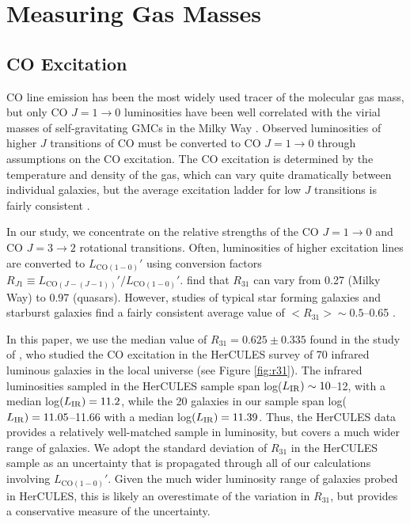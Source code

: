 \documentclass[a4paper,fleqn,usenatbib]{mnras}
\newcommand{\lir}{L_{\rm{IR}}}
\begin{document}

\appendix

\section{Measuring Gas Masses}

\subsection{CO Excitation} \label{sec:r31}

CO line emission has been the most widely used tracer of the molecular gas mass, but only CO $J=1\rightarrow0$ luminosities have been well correlated with the virial masses of self-gravitating GMCs in the Milky Way \citep{1987ApJS...63..821S,1987ApJ...319..730S}. Observed luminosities of higher $J$ transitions of CO must be converted to CO $J=1\rightarrow0$ through assumptions on the CO excitation. The CO excitation is determined by the temperature and density of the gas, which can vary quite dramatically between individual galaxies, but the average excitation ladder for low $J$ transitions is fairly consistent  \citep[e.g.][]{2013ARA&A..51..105C,2016ApJ...829...93K}. 

In our study, we concentrate on the relative strengths of the CO $J=1\rightarrow0$ and CO $J=3\rightarrow2$ rotational transitions. Often, luminosities of higher excitation lines are converted to $L_{\mathrm{CO(1-0)}}'$ using conversion factors $R_{J1} \equiv L_{\mathrm{CO}(J-(J-1))}' / L_{\mathrm{CO(1-0)}}'$.  \citet{2013ARA&A..51..105C} find that $R_{31}$ can vary from 0.27 (Milky Way) to 0.97 (quasars).  However, studies of typical star forming galaxies and starburst galaxies find a fairly consistent average value of $<R_{31}> \sim 0.5$--0.65 \citep{2013ARA&A..51..105C,2014ApJ...794..142G,2015ApJ...800...20G}.

In this paper, we use the median value of $R_{31} = 0.625 \pm 0.335$ found in the study of \citet{2012MNRAS.426.2601P}, who studied the CO excitation in the HerCULES survey of 70 infrared luminous galaxies in the local universe (see Figure \ref{fig:r31}). The infrared luminosities sampled in the HerCULES sample span log($\lir) \sim 10$--12, with a median log$(\lir) = 11.2$, while the 20 galaxies in our sample span log($\lir) = 11.05$--11.66 with a median log$(\lir) = 11.39$. Thus, the HerCULES data provides a relatively well-matched sample in luminosity, but covers a much wider range of galaxies. We adopt the standard deviation of $R_{31}$ in the HerCULES sample as an uncertainty that is propagated through all of our calculations involving $ L_{\mathrm{CO(1-0)}}'$. Given the much wider luminosity range of galaxies probed in HerCULES, this is likely an overestimate of the variation in $R_{31}$, but provides a conservative measure of the uncertainty.
\end{document}

